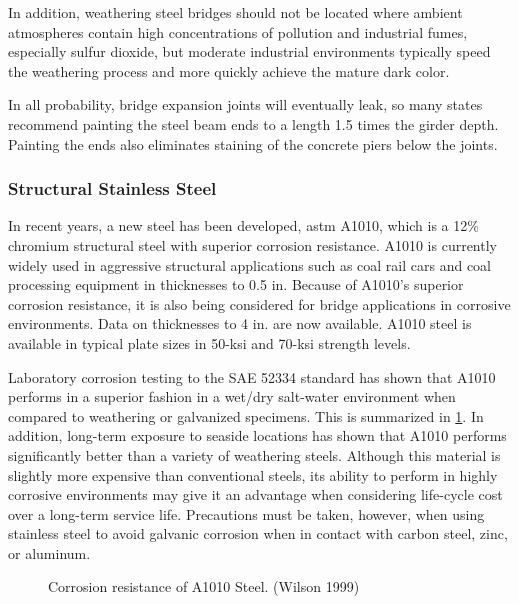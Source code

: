 In addition, weathering steel bridges should not be located where ambient atmospheres contain high
concentrations of pollution and industrial fumes, especially sulfur dioxide, but moderate industrial environments
typically speed the weathering process and more quickly achieve the mature dark color.

In all probability, bridge expansion joints will eventually leak, so many states recommend painting the steel beam
ends to a length 1.5 times the girder depth. Painting the ends also eliminates staining of the concrete piers below the
joints.

\subsubsection{Structural Stainless Steel}

In recent years, a new steel has been developed, \acrshort*{astm} A1010, which is a 12\% chromium structural steel with
superior corrosion resistance. A1010 is currently widely used in aggressive structural applications such as coal rail
cars and coal processing equipment in thicknesses to 0.5 in. Because of A1010’s superior corrosion resistance, it is
also being considered for bridge applications in corrosive environments. Data on thicknesses to 4 in. are now
available. A1010 steel is available in typical plate sizes in 50-ksi and 70-ksi strength levels.

Laboratory corrosion testing to the SAE 52334 standard has shown that A1010 performs in a superior fashion in
a wet/dry salt-water environment when compared to weathering or galvanized specimens. This is summarized in
\cref{fig:corrosion-resistance-a1010}. In addition, long-term exposure to seaside locations has shown that A1010 performs significantly better
than a variety of weathering steels. Although this material is slightly more expensive than conventional steels, its
ability to perform in highly corrosive environments may give it an advantage when considering life-cycle cost over a
long-term service life. Precautions must be taken, however, when using stainless steel to avoid galvanic corrosion
when in contact with carbon steel, zinc, or aluminum.

\begin{figure}
  \caption{Corrosion resistance of A1010 Steel. (Wilson 1999)}
  \label{fig:corrosion-resistance-a1010}
\end{figure}

